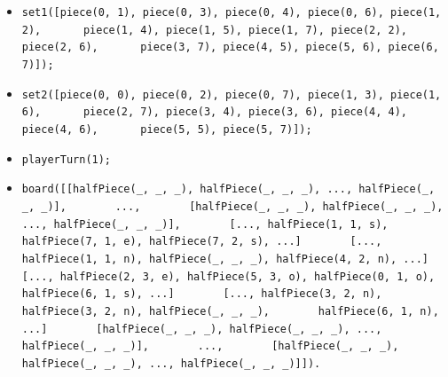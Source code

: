 \documentclass[a4paper]{article}
\begin{document}
\begin{itemize}
\item 
\verb|set1([piece(0, 1), piece(0, 3), piece(0, 4), piece(0, 6), piece(1, 2),|\linebreak
\verb|      piece(1, 4), piece(1, 5), piece(1, 7), piece(2, 2), piece(2, 6),|\linebreak
\verb|      piece(3, 7), piece(4, 5), piece(5, 6), piece(6, 7)]);|
\item
\verb|set2([piece(0, 0), piece(0, 2), piece(0, 7), piece(1, 3), piece(1, 6),|\linebreak
\verb|      piece(2, 7), piece(3, 4), piece(3, 6), piece(4, 4), piece(4, 6),|\linebreak
\verb|      piece(5, 5), piece(5, 7)]);|
\item \verb|playerTurn(1);|	
\item 
\verb|board([[halfPiece(_, _, _), halfPiece(_, _, _), ..., halfPiece(_, _, _)],|\linebreak
\verb|       ...,|\linebreak
\verb|       [halfPiece(_, _, _), halfPiece(_, _, _), ..., halfPiece(_, _, _)],|\linebreak
\verb|       [..., halfPiece(1, 1, s), halfPiece(7, 1, e), halfPiece(7, 2, s), ...]|\linebreak
\verb|       [..., halfPiece(1, 1, n), halfPiece(_, _, _), halfPiece(4, 2, n), ...]|\linebreak
\verb|       [..., halfPiece(2, 3, e), halfPiece(5, 3, o), halfPiece(0, 1, o),|\linebreak
\verb|       halfPiece(6, 1, s), ...]|\linebreak
\verb|       [..., halfPiece(3, 2, n), halfPiece(3, 2, n), halfPiece(_, _, _),|\linebreak
\verb|       halfPiece(6, 1, n), ...]|\linebreak
\verb|       [halfPiece(_, _, _), halfPiece(_, _, _), ..., halfPiece(_, _, _)],|\linebreak
\verb|       ...,|\linebreak
\verb|       [halfPiece(_, _, _), halfPiece(_, _, _), ..., halfPiece(_, _, _)]]).|\linebreak
\end{itemize}
\end{document}
